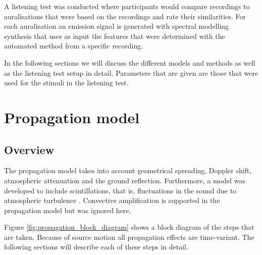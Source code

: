 \documentclass[10pt,twocolumn]{article}
\begin{document}
A listening test was conducted where participants would
compare recordings to auralisations that were based on the recordings and rate their
similarities. For each auralisation an emission signal is generated with
spectral modelling synthesis that uses as input the features that were
determined with the automated method from a specific recording.

In the following sections we will discuss the different models and methods as
well as the listening test setup in detail. Parameters that are given are those
that were used for the stimuli in the listening test.

\section{Propagation model}

\subsection{Overview}
The propagation model takes into account geometrical spreading, Doppler shift,
atmospheric attenuation and the ground reflection. Furthermore, a model was
developed to include scintillations, that is, fluctuations in the sound due to atmospheric
turbulence \cite{Rietdijk2017}. Convective amplification is supported in the
propagation model but was ignored here.

Figure \ref{fig:propagation_block_diagram} shows
a block diagram of the steps that are taken. Because of source motion all propagation effects are time-variant.
The following sections will describe each of these steps in detail.
\end{document}
